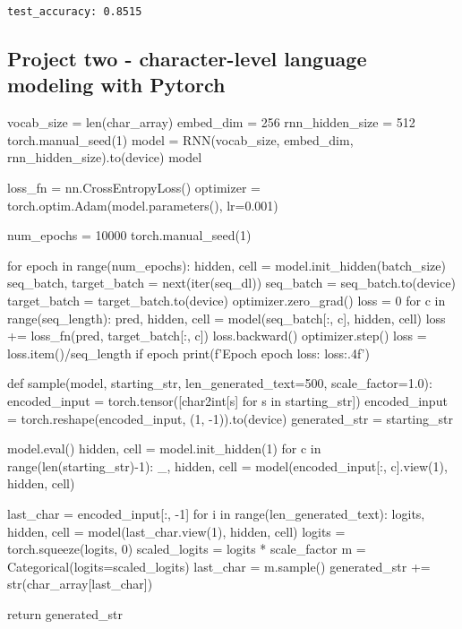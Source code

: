 \begin{verbatim}
test_accuracy: 0.8515
\end{verbatim}

\subsection{Project two - character-level language modeling with Pytorch}

\begin{pythoncode}
vocab_size = len(char_array)
embed_dim = 256
rnn_hidden_size = 512
torch.manual_seed(1)
model = RNN(vocab_size, embed_dim, rnn_hidden_size).to(device)
model
\end{pythoncode}

\begin{pythoncode}
loss_fn = nn.CrossEntropyLoss()
optimizer = torch.optim.Adam(model.parameters(), lr=0.001)

num_epochs = 10000
torch.manual_seed(1)

for epoch in range(num_epochs):
    hidden, cell = model.init_hidden(batch_size)
    seq_batch, target_batch = next(iter(seq_dl))
    seq_batch = seq_batch.to(device)
    target_batch = target_batch.to(device)
    optimizer.zero_grad()
    loss = 0
    for c in range(seq_length):
        pred, hidden, cell = model(seq_batch[:, c], hidden, cell)
        loss += loss_fn(pred, target_batch[:, c])
    loss.backward()
    optimizer.step()
    loss = loss.item()/seq_length
    if epoch %
        print(f'Epoch {epoch} loss: {loss:.4f}')
\end{pythoncode}

\begin{pythoncode}
def sample(model, starting_str, len_generated_text=500, scale_factor=1.0):
    encoded_input = torch.tensor([char2int[s] for s in starting_str])
    encoded_input = torch.reshape(encoded_input, (1, -1)).to(device)
    generated_str = starting_str
    
    model.eval()
    hidden, cell = model.init_hidden(1)
    for c in range(len(starting_str)-1):
        _, hidden, cell = model(encoded_input[:, c].view(1), hidden, cell)

    last_char = encoded_input[:, -1]
    for i in range(len_generated_text):
        logits, hidden, cell = model(last_char.view(1), hidden, cell)
        logits = torch.squeeze(logits, 0)
        scaled_logits = logits * scale_factor
        m = Categorical(logits=scaled_logits)
        last_char = m.sample()
        generated_str += str(char_array[last_char])

    return generated_str
\end{pythoncode}

